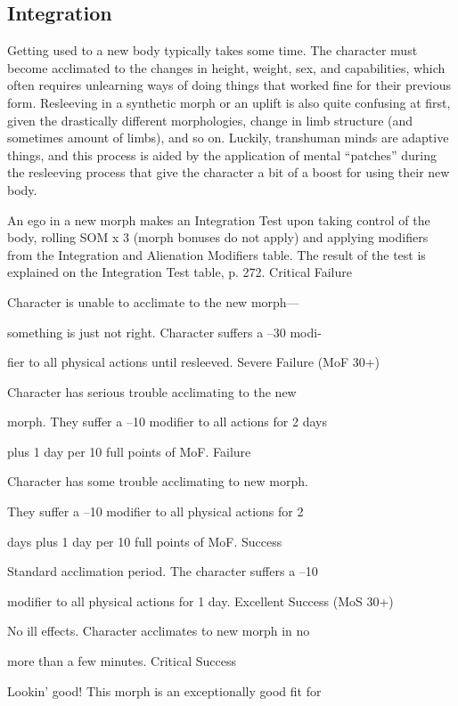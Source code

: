 \subsection{Integration}

Getting used to a new body typically takes some time. 
The character must become acclimated to the changes 
in height, weight, sex, and capabilities, which often 
requires unlearning ways of doing things that worked 
fine for their previous form. Resleeving in a synthetic 
morph or an uplift is also quite confusing at first, 
given the drastically different morphologies, change in 
limb structure (and sometimes amount of limbs), and 
so on. Luckily, transhuman minds are adaptive things, 
and this process is aided by the application of mental 
``patches'' during the resleeving process that give the 
character a bit of a boost for using their new body.

An ego in a new morph makes an Integration Test 
upon taking control of the body, rolling SOM x 3 (morph 
bonuses do not apply) and applying modifiers from the 
Integration and Alienation Modifiers table. The result of 
the test is explained on the Integration Test table, p. 272.
Critical Failure

Character is unable to acclimate to the new morph—

something is just not right. Character suffers a –30 modi-

fier to all physical actions until resleeved.
Severe Failure (MoF 30+)

Character has serious trouble acclimating to the new 

morph. They suffer a –10 modifier to all actions for 2 days 

plus 1 day per 10 full points of MoF.
Failure

Character has some trouble acclimating to new morph. 

They suffer a –10 modifier to all physical actions for 2 

days plus 1 day per 10 full points of MoF.
Success

Standard acclimation period. The character suffers a –10 

modifier to all physical actions for 1 day.
Excellent Success (MoS 30+)

No ill effects. Character acclimates to new morph in no 

more than a few minutes.
Critical Success

Lookin' good! This morph is an exceptionally good fit for 

